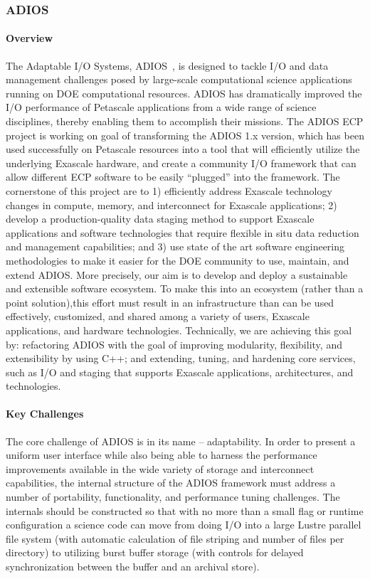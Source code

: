 \subsubsection{ ADIOS} 
\paragraph{Overview} 
The Adaptable I/O Systems, ADIOS~\cite{liu2014hello}, is designed to tackle I/O and data management challenges posed  by  large-scale computational science applications running on DOE computational resources. ADIOS has  dramatically  improved  the I/O performance of Petascale  applications from a   wide range of science disciplines, thereby enabling them to accomplish their missions. The ADIOS ECP project is working on goal of transforming the ADIOS 1.x version, which has been used successfully on Petascale resources into a tool that will efficiently utilize  the underlying Exascale hardware, and create a   community I/O framework that can allow different ECP software to be easily  “plugged” into the framework. The cornerstone of this project are to 1) efficiently  address Exascale technology changes in compute, memory, and interconnect for Exascale applications; 2) develop  a  production-quality data staging method to support Exascale applications and software  technologies that require flexible in situ data reduction and management capabilities; and 3) use state  of the  art software engineering methodologies to    make it   easier for the DOE community to    use, maintain, and extend ADIOS. More precisely, our aim is to    develop and deploy a   sustainable and extensible software ecosystem. To make this into an ecosystem (rather than a point solution),this effort must result in  an  infrastructure than can be used effectively, customized, and shared among a   variety of users, Exascale applications, and hardware technologies. Technically, we are achieving  this goal  by: refactoring ADIOS  with the  goal  of improving modularity, flexibility, and extensibility by using C++; and extending, tuning, and hardening core services, such as I/O and staging that supports Exascale applications, architectures, and technologies.

\paragraph{Key  Challenges}
The core challenge of ADIOS is in its name -- adaptability.  In order to present a uniform user interface while also being able to harness the performance improvements available in the wide variety of storage and interconnect capabilities, the internal structure of the ADIOS framework must address a number of portability, functionality, and performance tuning challenges.  The internals should be constructed so that with no more than a small flag or runtime configuration a science code can move from doing I/O into a large Lustre parallel file system (with automatic calculation of file striping and number of files per directory) to utilizing burst buffer storage (with controls for delayed synchronization between the buffer and an archival store).  

